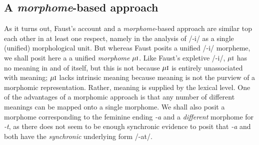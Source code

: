 \subsection{A \emph{morphome}-based approach}
As it turns out, Faust's account and a \emph{morphome}-based approach 
are similar top each other in at least one respect, namely in the analysis of /-i/
as a single (unified) morphological unit. But whereas Faust posits a unified 
/-i/ morpheme, we shall posit here a 
a unified \emph{morphome} $\mu{\textsc{i}}$. Like Faust's expletive /-i/,
$\mu{\textsc{i}}$ has no meaning in and of itself, but this is not 
because $\mu{\textsc{i}}$ is entirely unassociated with meaning; 
$\mu{\textsc{i}}$ lacks intrinsic meaning because meaning is not the 
purview of a morphomic representation. Rather, meaning is supplied by 
the lexical level. One of the advantages of a morphomic approach
is that any number of different meanings can be mapped onto a single 
morphome. We shall also posit a morphome corresponding to the 
feminine ending \textit{-a} and a \emph{different} morphome for 
\textit{-t}, as there does not seem to be enough synchronic evidence to posit that 
\textit{-a} and  both have the \emph{synchronic} 
underlying form /-at/.
